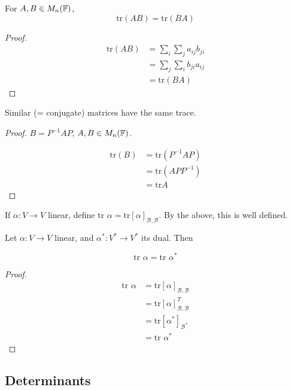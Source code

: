 \documentclass[a4paper]{article}
\begin{document}
\begin{lemma} 
	For $ A,B \in M_{n}(\mathbb{F}) $, 
	\[ \text{tr}(AB) = \text{tr}(BA) \]
\end{lemma}

\begin{proof}
	\begin{align*}
	\text{tr}(AB) & = \sum_{i} \sum_{j} a_{ij} b_{ji}  \\
	& = \sum_{j} \sum_{i} b_{ji} a_{ij} \\
	& = \text{tr}(BA)
	\end{align*}
\end{proof}


\begin{lemma} 
	Similar (= conjugate) matrices have the same trace.
\end{lemma}

\begin{proof}
	$ B = P^{-1} A P $, $ A,B \in M_{n}(\mathbb{F}) $.
	
	
	\begin{align*}
	\text{tr}(B) & = \text{tr}(P^{-1}AP) \\
	& = \text{tr}(AP P^{-1}) \\
	& = \text{tr}A
	\end{align*}
\end{proof}

\begin{defi}
	If $  \alpha : V \to V $ linear, define $ \text{tr } \alpha = \text{tr}[\alpha]_{\mathcal{B},\mathcal{B}} $. By the above, this is well defined. 
\end{defi}

\begin{lemma}  
	Let $ \alpha : V \to V $ linear, and $ \alpha^{*} : V^{*} \to V^{*} $ its dual. Then
	
	\[ \text{tr }\alpha = \text{tr }\alpha^{*} \]
\end{lemma}

\begin{proof}
	\begin{align*}
	\text{tr }\alpha & = \text{tr}[\alpha]_{\mathcal{B},\mathcal{B}}  \\
	& = \text{tr}[\alpha]_{\mathcal{B},\mathcal{B}}^{T} \\
	& = \text{tr}[\alpha^{*}]_{\mathcal{B}^{*}} \\
	& = \text{tr } \alpha^{*	} 
	\end{align*}
\end{proof}

\subsection{Determinants}
\end{document}

